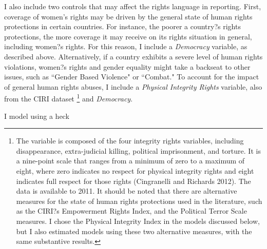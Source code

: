 \documentclass[11pt, oneside]{article}
\begin{document}
I also include two controls that may affect the rights language in reporting. First, coverage of women's rights may be driven by the general state of human rights protections in certain countries. For instance, the poorer a country?s rights protections, the more coverage it may receive on its rights situation in general, including women?s rights. For this reason, I include a \emph{Democracy} variable, as described above. Alternatively, if a country exhibits a severe level of human rights violations, women?s rights and gender equality might take a backseat to other issues, such as ``Gender Based Violence" or ``Combat." To account for the impact of general human rights abuses, I include a \emph{Physical Integrity Rights} variable, also from the CIRI dataset \footnote{The variable is composed of the four integrity rights variables, including disappearance, extra-judicial killing, political imprisonment, and torture. It is a nine-point scale that ranges from a minimum of zero to a maximum of eight, where zero indicates no respect for physical integrity rights and eight indicates full respect for those rights (Cingranelli and Richards 2012). The data is available to 2011. It should be noted that there are alternative measures for the state of human rights protections used in the literature, such as the CIRI?s Empowerment Rights Index, and the Political Terror Scale measures. I chose the Physical Integrity Index in the models discussed below, but I also estimated models using these two alternative measures, with the same substantive results.} and \emph{Democracy}. 

I model using a heck 
\end{document}
